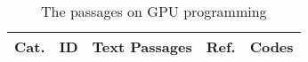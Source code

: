 \clearpage
\onecolumn

{\tiny
\begin{longtable}{|l|p{0.6cm}|p{11.8cm}|p{0.6cm}|p{2cm}|}
	\caption{The passages on GPU programming}\label{tab:gpu_passages}                                                                                                                                                                                                                                                                                                                                                                                                                                                              \\

	\toprule
	Cat. & ID & Text Passages                                                                                                                                                                                                                                                                                                                                                                                                                                                                                              & Ref. & Codes \\
	\midrule
	\endfirsthead


\end{longtable}}
